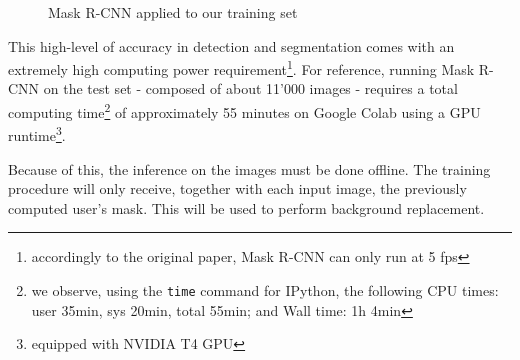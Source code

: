 \begin{figure}[!h]
\begin{center}
\begin{subfigure}[h]{0.32\textwidth}
		\end{subfigure}
	\end{center}
	\vspace{-0.5cm}
	\caption[Mask R-CNN applied to our training set]{Mask R-CNN applied to our training set}
	\label{fig:maskrcnn-dario}
\end{figure}

This high-level of accuracy in detection and segmentation comes with an extremely high computing power requirement\footnote{accordingly to the original paper, Mask R-CNN can only run at 5 \gls{fps}}. For reference, running Mask R-CNN on the test set - composed of about 11'000 images - requires a total computing time\footnote{we observe, using the \texttt{time} command for IPython, the following CPU times: user 35min, sys 20min, total 55min; and Wall time: 1h 4min} of approximately 55 minutes on Google Colab using a GPU runtime\footnote{equipped with NVIDIA T4 GPU}.

Because of this, the inference on the images must be done offline. The training procedure will only receive, together with each input image, the previously computed user's mask. This will be used to perform background replacement.









